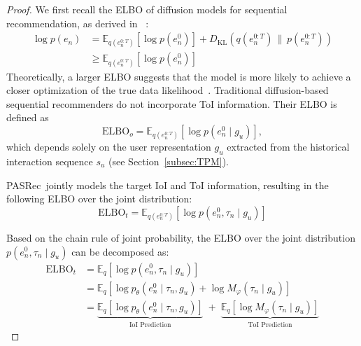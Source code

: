 \documentclass[sigconf,nonacm]{acmart}
\newcommand{\modelname}{PASRec}
\begin{document}
\begin{proof}
We first recall the ELBO of diffusion models for sequential recommendation, as derived in ~\cite{luo2022understanding, yang2023generate}:
\begin{align}
\log p({e}_n) 
&= \mathbb{E}_{q({e}_n^{0:T})} \left[ \log p({e}_n^{0}) \right] 
+ D_{\mathrm{KL}} \left( q({e}_n^{0:T}) \,\|\, p({e}_n^{0:T}) \right) \\
&\geq \mathbb{E}_{q({e}_n^{0:T})} \left[ \log p({e}_n^{0}) \right] 
\end{align}
Theoretically, a larger ELBO suggests that the model is more likely to achieve a closer optimization of the true data likelihood~\cite{ho2020denoising}. Traditional diffusion-based sequential recommenders do not incorporate ToI information. Their ELBO is defined as
\begin{equation}
\mathrm{ELBO}_o =\mathbb{E}_{q({e}_n^{0:T})} \left[ \log p({e}_n^0 \mid {g}_u) \right],
\label{eq:elbo_without_time}
\end{equation}
which depends solely on the user representation \( {g}_u \) extracted from the historical interaction sequence \( {s}_u \) (see Section~\ref{subsec:TPM}).

\modelname\ jointly models the target IoI and ToI information, resulting in the following ELBO over the joint distribution:
\begin{equation}
\mathrm{ELBO}_t = \mathbb{E}_{q(e_n^{0:T})} \left[ \log p({e}_n^0, {\tau}_n \mid {g}_u) \right]
\label{eq:elbo_joint}
\end{equation}

Based on the chain rule of joint probability, the ELBO over the joint distribution \( p({e}_n^0, {\tau}_n \mid {g}_u) \) can be decomposed as:
\begin{equation}
\begin{aligned}
\label{equation_ELBOTAGDiff}
\mathrm{ELBO}_t 
&= \mathbb{E}_{q} \left[ \log p({e}_n^0, {\tau}_n \mid {g}_u) \right] \\
&= \mathbb{E}_{q} \left[ \log p_\theta({e}_n^0 \mid {\tau}_n, {g}_u) + \log M_\varphi({\tau}_n \mid {g}_u) \right] \\
&= \underbrace{\mathbb{E}_{q} \left[ \log p_\theta({e}_n^0 \mid {\tau}_n, {g}_u) \right]}_{\text{IoI Prediction}}
\; + \;
\underbrace{\mathbb{E}_{q} \left[ \log M_\varphi({\tau}_n \mid {g}_u) \right]}_{\text{ToI Prediction}}
\end{aligned}
\end{equation}


\end{proof}
\end{document}
